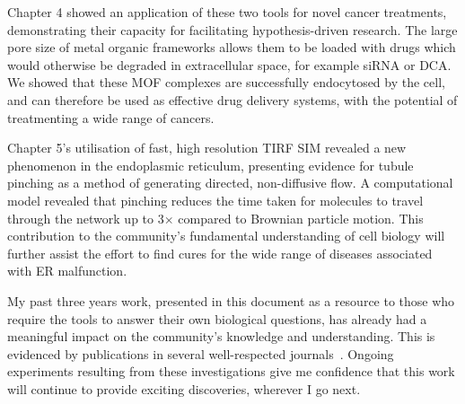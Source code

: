 Chapter 4 showed an application of these two tools for novel cancer treatments, demonstrating their capacity for facilitating hypothesis-driven research. 
The large pore size of metal organic frameworks allows them to be loaded with drugs which would otherwise be degraded in extracellular space, for example siRNA or DCA. 
We showed that these MOF complexes are successfully endocytosed by the cell, and can therefore be used as effective drug delivery systems, with the potential of treatmenting a wide range of cancers. 

Chapter 5's utilisation of fast, high resolution TIRF SIM revealed a new phenomenon in the endoplasmic reticulum, presenting evidence for tubule pinching as a method of generating directed, non-diffusive flow. 
A computational model revealed that pinching reduces the time taken for molecules to travel through the network up to 3$\times$ compared to Brownian particle motion. 
This contribution to the community's fundamental understanding of cell biology will further assist the effort to find cures for the wide range of diseases associated with ER malfunction.

My past three years work, presented in this document as a resource to those who require the tools to answer their own biological questions, has already had a meaningful impact on the community's knowledge and understanding.
This is evidenced by publications in several well-respected journals~\cite{teplensky2017temperature, fantham2017new, moghadam2018computer, holcman2018single, lautenschlager2018c}. 
Ongoing experiments resulting from these investigations give me confidence that this work will continue to provide exciting discoveries, wherever I go next. 

%
